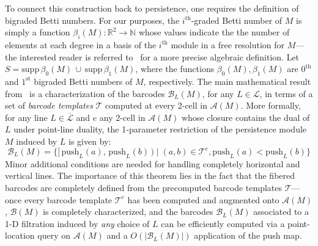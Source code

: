 \documentclass[sn-mathphys]{sn-jnl}
\begin{document}
To connect this construction back to persistence, one requires the definition of bigraded Betti numbers. For our purposes, the $i^{\text{th}}$-graded Betti number of $M$ is simply a function $\beta_i(M): \mathbb{R}^2 \to \mathbb{N}$ whose values indicate the the number of elements at each degree in a basis of the $i^{\text{th}}$ module in a free resolution for $M$---the interested reader is referred to~\cite{lesnick2015interactive, carlsson2009theory} for a more precise algebraic definition. 
Let $S = \mathrm{supp}\,\beta_0(M) \, \cup \, \mathrm{supp}\,\beta_1(M)$, where the functions $\beta_0(M), \beta_1(M)$ are $0^{\text{th}}$ and $1^{\text{st}}$ bigraded Betti numbers of $M$, respectively. 
The main mathematical result from~\cite{lesnick2015interactive} is a characterization of the barcodes $\mathcal{B}_L(M)$, for any $L \in \mathcal{L}$, in terms of a set of \emph{barcode templates} $\mathcal{T}$ computed at every 2-cell in $\mathcal{A}(M)$.
 More formally, for any line $L \in \overline{\mathcal{L}}$ and $e$ any 2-cell in $\mathcal{A}(M)$ whose closure contains the dual of $L$ under point-line duality, the 1-parameter restriction of the persistence module $M$ induced by $L$ is given by: 
 \begin{equation}
 \mathcal{B}_L(M) = \{ [\,\mathrm{push}_L(a), \, \mathrm{push}_L(b)\,) \mid (a,b) \in \mathcal{T}^e, \mathrm{push}_L(a) < \mathrm{push}_L(b)  \} 
\end{equation}
Minor additional conditions are needed for handling completely horizontal and vertical lines. 
The importance of this theorem lies in the fact that the fibered barcodes are completely defined from the precomputed barcode templates $\mathcal{T}$---once every barcode template $\mathcal{T}^e$ has been computed and augmented onto $\mathcal{A}(M)$, $\mathcal{B}(M)$ is completely characterized, and the barcodes $\mathcal{B}_L(M)$ associated to a 1-D filtration induced by \emph{any} choice of $L$ can be efficiently computed via a point-location query on $\mathcal{A}(M)$ and a $O(\lvert \mathcal{B}_L(M) \rvert)$ application of the push map.
\end{document}
